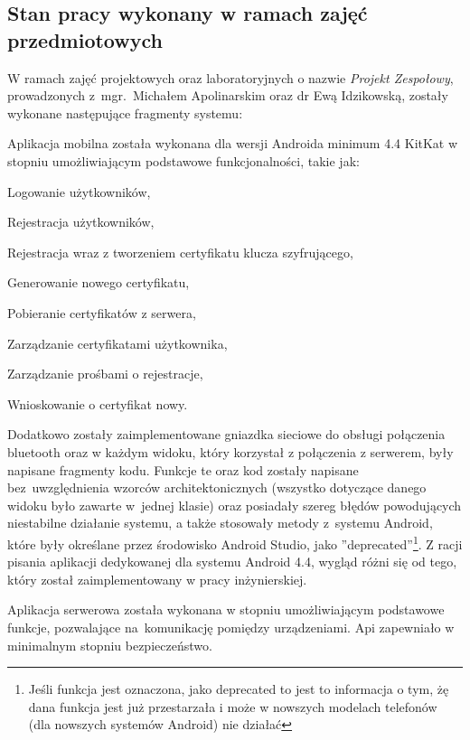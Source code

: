 \documentclass[twoside,10pt]{article}
\begin{document}
\newpage
\subsection{Stan pracy wykonany w ramach zajęć przedmiotowych} \label{sec:Stan pracy wykonany w ramach zajęć przedmiotowych}
W ramach zajęć projektowych oraz laboratoryjnych o nazwie \textit{Projekt Zespołowy}, prowadzonych \linebreak z~mgr.~Michałem Apolinarskim oraz dr Ewą Idzikowską, zostały wykonane następujące fragmenty systemu:

Aplikacja mobilna została wykonana dla wersji Androida minimum 4.4 KitKat w stopniu umożliwiającym podstawowe funkcjonalności, takie jak:
\begin{itemize*}
\item Logowanie użytkowników,
\item Rejestracja użytkowników,
\item Rejestracja wraz z tworzeniem certyfikatu klucza szyfrującego,
\item Generowanie nowego certyfikatu,
\item Pobieranie certyfikatów z serwera,
\item Zarządzanie certyfikatami użytkownika,
\item Zarządzanie prośbami o rejestracje,
\item Wnioskowanie o certyfikat nowy.
\end{itemize*}

Dodatkowo zostały zaimplementowane gniazdka sieciowe do obsługi połączenia bluetooth oraz w każdym widoku, który korzystał z połączenia z serwerem, były napisane fragmenty kodu. Funkcje te oraz kod zostały napisane bez~uwzględnienia wzorców architektonicznych (wszystko dotyczące danego widoku było zawarte w~jednej klasie) oraz posiadały szereg błędów powodujących niestabilne działanie systemu, a także stosowały metody z~systemu Android, które były określane przez środowisko Android Studio, jako ''deprecated''\footnote{ Jeśli funkcja jest oznaczona, jako deprecated to jest to informacja o tym, żę dana funkcja jest już przestarzała i może w nowszych modelach telefonów (dla nowszych systemów Android) nie działać}. Z racji pisania aplikacji dedykowanej dla systemu Android 4.4, wygląd różni się od tego, który został zaimplementowany w pracy inżynierskiej.

Aplikacja serwerowa została wykonana w stopniu umożliwiającym podstawowe funkcje, pozwalające na~komunikację pomiędzy urządzeniami. Api zapewniało w minimalnym stopniu bezpieczeństwo. 
\end{document}
